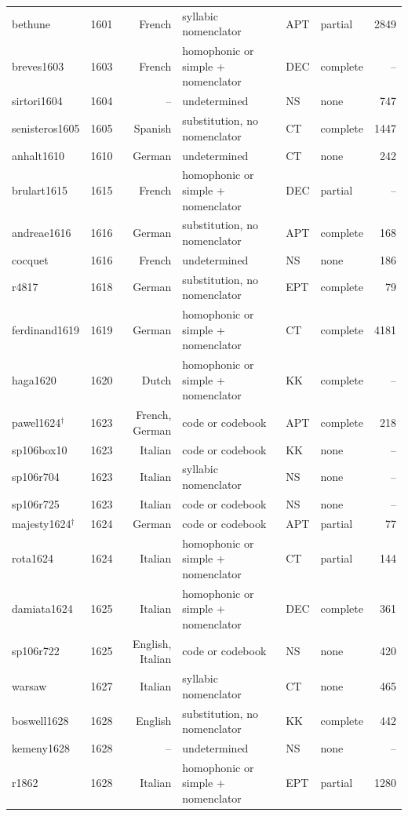 {\begin{longtable}{@{}llrlllr@{}}
bethune & 1601 & French & syllabic nomenclator & APT & partial & 2849 \\
breves1603 & 1603 & French & homophonic or simple + nomenclator & DEC & complete & -- \\
sirtori1604 & 1604 & -- & undetermined & NS & none & 747 \\
senisteros1605 & 1605 & Spanish & substitution, no nomenclator & CT & complete & 1447 \\
anhalt1610 & 1610 & German & undetermined & CT & none & 242 \\
brulart1615 & 1615 & French & homophonic or simple + nomenclator & DEC & partial & -- \\
andreae1616 & 1616 & German & substitution, no nomenclator & APT & complete & 168 \\
cocquet & 1616 & French & undetermined & NS & none & 186 \\
r4817 & 1618 & German & substitution, no nomenclator & EPT & complete & 79 \\
ferdinand1619 & 1619 & German & homophonic or simple + nomenclator & CT & complete & 4181 \\
haga1620 & 1620 & Dutch & homophonic or simple + nomenclator & KK & complete & -- \\
pawel1624$^\dagger$ & 1623 & French, German & code or codebook & APT & complete & 218 \\
sp106box10 & 1623 & Italian & code or codebook & KK & none & -- \\
sp106r704 & 1623 & Italian & syllabic nomenclator & NS & none & -- \\
sp106r725 & 1623 & Italian & code or codebook & NS & none & -- \\
majesty1624$^\dagger$ & 1624 & German & code or codebook & APT & partial & 77 \\
rota1624 & 1624 & Italian & homophonic or simple + nomenclator & CT & partial & 144 \\
damiata1624 & 1625 & Italian & homophonic or simple + nomenclator & DEC & complete & 361 \\
sp106r722 & 1625 & English, Italian & code or codebook & NS & none & 420 \\
warsaw & 1627 & Italian & syllabic nomenclator & CT & none & 465 \\
boswell1628 & 1628 & English & substitution, no nomenclator & KK & complete & 442 \\
kemeny1628 & 1628 & -- & undetermined & NS & none & -- \\
r1862 & 1628 & Italian & homophonic or simple + nomenclator & EPT & partial & 1280 \\

\end{longtable}}
